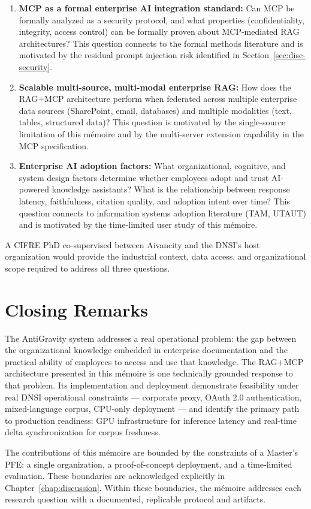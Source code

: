 \begin{enumerate}
\item \textbf{MCP as a formal enterprise AI integration standard:} Can MCP be formally analyzed as a security protocol, and what properties (confidentiality, integrity, access control) can be formally proven about MCP-mediated RAG architectures? This question connects to the formal methods literature and is motivated by the residual prompt injection risk identified in Section~\ref{sec:disc-security}.

\item \textbf{Scalable multi-source, multi-modal enterprise RAG:} How does the RAG+MCP architecture perform when federated across multiple enterprise data sources (SharePoint, email, databases) and multiple modalities (text, tables, structured data)? This question is motivated by the single-source limitation of this mémoire and by the multi-server extension capability in the MCP specification.

\item \textbf{Enterprise AI adoption factors:} What organizational, cognitive, and system design factors determine whether employees adopt and trust AI-powered knowledge assistants? What is the relationship between response latency, faithfulness, citation quality, and adoption intent over time? This question connects to information systems adoption literature (TAM, UTAUT) and is motivated by the time-limited user study of this mémoire.
\end{enumerate}

A CIFRE PhD co-supervised between Aivancity and the DNSI's host organization would provide the industrial context, data access, and organizational scope required to address all three questions.

\section{Closing Remarks}
\label{sec:conc-remarks}

The AntiGravity system addresses a real operational problem: the gap between the organizational knowledge embedded in enterprise documentation and the practical ability of employees to access and use that knowledge. The RAG+MCP architecture presented in this mémoire is one technically grounded response to that problem. Its implementation and deployment demonstrate feasibility under real DNSI operational constraints --- corporate proxy, OAuth 2.0 authentication, mixed-language corpus, CPU-only deployment --- and identify the primary path to production readiness: GPU infrastructure for inference latency and real-time delta synchronization for corpus freshness.

The contributions of this mémoire are bounded by the constraints of a Master's PFE: a single organization, a proof-of-concept deployment, and a time-limited evaluation. These boundaries are acknowledged explicitly in Chapter~\ref{chap:discussion}. Within these boundaries, the mémoire addresses each research question with a documented, replicable protocol and artifacts.

